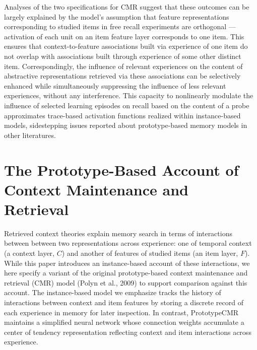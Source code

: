 \documentclass[
  letterpaper,
  DIV=11]{article}
\begin{document}
Analyses of the two specifications for CMR suggest that these outcomes
can be largely explained by the model's assumption that feature
representations corresponding to studied items in free recall
experiments are orthogonal --- activation of each unit on an item
feature layer corresponds to one item. This ensures that
context-to-feature associations built via experience of one item do not
overlap with associations built through experience of some other
distinct item. Correspondingly, the influence of relevant experiences on
the content of abstractive representations retrieved via these
associations can be selectively enhanced while simultaneously
suppressing the influence of less relevant experiences, without any
interference. This capacity to nonlinearly modulate the influence of
selected learning episodes on recall based on the content of a probe
approximates trace-based activation functions realized within
instance-based models, sidestepping issues reported about
prototype-based memory models in other literatures.

\hypertarget{the-prototype-based-account-of-context-maintenance-and-retrieval}{%
\section{The Prototype-Based Account of Context Maintenance and
Retrieval}\label{the-prototype-based-account-of-context-maintenance-and-retrieval}}

Retrieved context theories explain memory search in terms of
interactions between between two representations across experience: one
of temporal context (a context layer, \(C\)) and another of features of
studied items (an item layer, \(F\)). While this paper introduces an
instance-based account of these interactions, we here specify a variant
of the original prototype-based context maintenance and retrieval (CMR)
model (Polyn et al., 2009) to support comparison against this account.
The instance-based model we emphasize tracks the history of interactions
between context and item features by storing a discrete record of each
experience in memory for later inspection. In contrast, PrototypeCMR
maintains a simplified neural network whose connection weights
accumulate a center of tendency representation reflecting context and
item interactions across experience.
\end{document}
